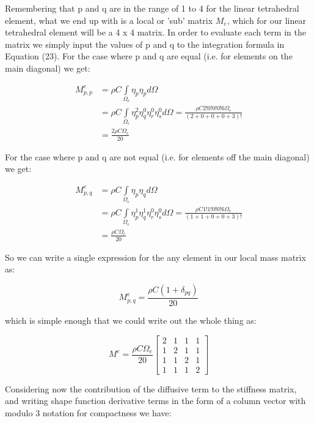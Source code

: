 \documentclass[12pt]{article}
\begin{document}
Remembering that p and q are in the range of 1 to 4 for the linear tetrahedral element,
what we end up with is a local or 'sub' matrix $M_e$, which for our linear tetrahedral
element will be a 4 x 4 matrix. In order to evaluate each term in the matrix we
simply input the values of p and q to the integration formula in Equation (23). For
the case where p and q are equal (i.e. for elements on the main diagonal) we get:

\begin{align*}
 M_{p,p}^e & = \rho C  \int\limits_{\Omega_e} \eta_p \eta_p d\Omega \\
              	& = \rho C \int\limits_{\Omega_e} \eta_p^2 \eta_q^0 \eta_r^0 \eta_s^0 d{\Omega}=
 \frac{\rho C 2!0!0!0!6\Omega_e}{(2+0+0+0+3)!} \\
 				& = \frac{2\rho C \Omega_e}{20}
\end{align*}

For the case where p and q are not equal (i.e. for elements off the main diagonal) we get:

\begin{align*}
 M_{p,q}^e & = \rho C \int\limits_{\Omega_e} \eta_p \eta_q d\Omega \\
              	& = \rho C \int\limits_{\Omega_e} \eta_p^1 \eta_q^1 \eta_r^0 \eta_s^0 d{\Omega}=
 \frac{\rho C 1!1!0!0!6\Omega_e}{(1+1+0+0+3)!} \\
 				& = \frac{\rho C \Omega_e}{20}
\end{align*}

So we can write a single expression for the any element in our local mass matrix as:

$$
M_{p,q}^e = \frac{\rho C (1+\delta_{pq})}{20}
$$

which is simple enough that we could write out the whole thing as:

\begin{equation}
M^e = \frac{\rho C \Omega_e}{20}{\begin{bmatrix} 2 & 1 & 1 & 1 \\ 1 & 2 & 1 & 1 \\ 1 & 1 & 2 & 1 \\ 1 & 1 & 1 & 2 \end{bmatrix}}
\end{equation}

Considering now the contribution of the diffusive term to the stiffness matrix, and writing shape function derivative terms in the form of a column vector with modulo 3 notation for compactness we have:
\end{document}

